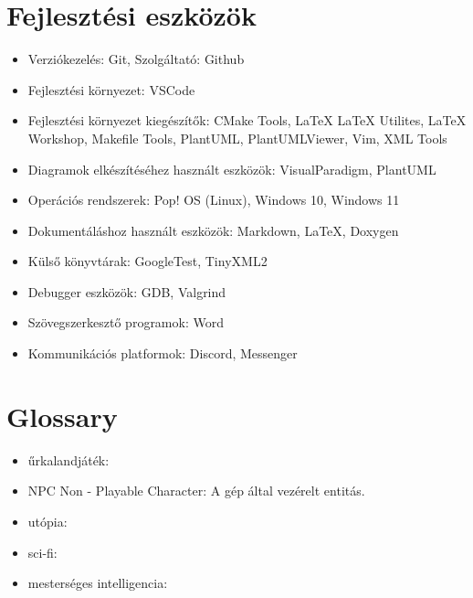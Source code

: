 \documentclass{scrarticle}
\begin{document}
\section{Fejlesztési eszközök}
\begin{itemize}
    \item Verziókezelés: Git, Szolgáltató: Github
    \item Fejlesztési környezet: VSCode
    \item Fejlesztési környezet kiegészítők: CMake Tools, LaTeX LaTeX Utilites, LaTeX Workshop, Makefile Tools, PlantUML, PlantUMLViewer, Vim, XML Tools
    \item Diagramok elkészítéséhez használt eszközök: VisualParadigm, PlantUML
    \item Operációs rendszerek: Pop! OS (Linux), Windows 10, Windows 11
    \item Dokumentáláshoz használt eszközök: Markdown, LaTeX, Doxygen
    \item Külső könyvtárak: GoogleTest, TinyXML2
    \item Debugger eszközök: GDB, Valgrind
    \item Szövegszerkesztő programok: Word
    \item Kommunikációs platformok: Discord, Messenger
\end{itemize}

\section{Glossary}
\begin{itemize}
   \item űrkalandjáték: 
   \item NPC Non - Playable Character: A gép által vezérelt entitás.
   \item utópia: 
   \item sci-fi:
   \item mesterséges intelligencia: 
\end{itemize}
\end{document}
